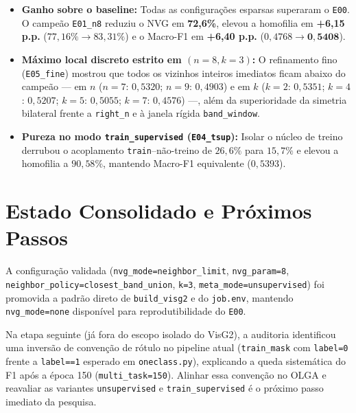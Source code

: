 \documentclass[11pt,a4paper]{article}
\begin{document}
\begin{itemize}
    \item \textbf{Ganho sobre o baseline:} Todas as configurações esparsas superaram o \texttt{E00}. O campeão \texttt{E01\_n8} reduziu o NVG em \textbf{72,6\%}, elevou a homofilia em \textbf{+6,15 p.p.} ($77{,}16\% \rightarrow 83{,}31\%$) e o Macro-F1 em \textbf{+6,40 p.p.} ($0{,}4768 \rightarrow \mathbf{0{,}5408}$).
    \item \textbf{Máximo local discreto estrito em $(n=8, k=3)$:} O refinamento fino (\texttt{E05\_fine}) mostrou que todos os vizinhos inteiros imediatos ficam abaixo do campeão — em $n$ ($n=7$: $0{,}5320$; $n=9$: $0{,}4903$) e em $k$ ($k=2$: $0{,}5351$; $k=4$: $0{,}5207$; $k=5$: $0{,}5055$; $k=7$: $0{,}4576$) —, além da superioridade da simetria bilateral frente a \texttt{right\_n} e à janela rígida \texttt{band\_window}.
    \item \textbf{Pureza no modo \texttt{train\_supervised} (\texttt{E04\_tsup}):} Isolar o núcleo de treino derrubou o acoplamento \texttt{train}--não-treino de $26{,}6\%$ para $15{,}7\%$ e elevou a homofilia a \textbf{$90{,}58\%$}, mantendo Macro-F1 equivalente ($0{,}5393$).
\end{itemize}

\section{Estado Consolidado e Próximos Passos}
A configuração validada (\texttt{nvg\_mode=neighbor\_limit}, \texttt{nvg\_param=8}, \texttt{neighbor\_policy=closest\_band\_union}, \texttt{k=3}, \texttt{meta\_mode=unsupervised}) foi promovida a padrão direto de \texttt{build\_visg2} e do \texttt{job.env}, mantendo \texttt{nvg\_mode=none} disponível para reprodutibilidade do \texttt{E00}.

Na etapa seguinte (já fora do escopo isolado do VisG2), a auditoria identificou uma inversão de convenção de rótulo no pipeline atual (\texttt{train\_mask} com \texttt{label=0} frente a \texttt{label==1} esperado em \texttt{oneclass.py}), explicando a queda sistemática do F1 após a época 150 (\texttt{multi\_task=150}). Alinhar essa convenção no OLGA e reavaliar as variantes \texttt{unsupervised} e \texttt{train\_supervised} é o próximo passo imediato da pesquisa.
\end{document}
